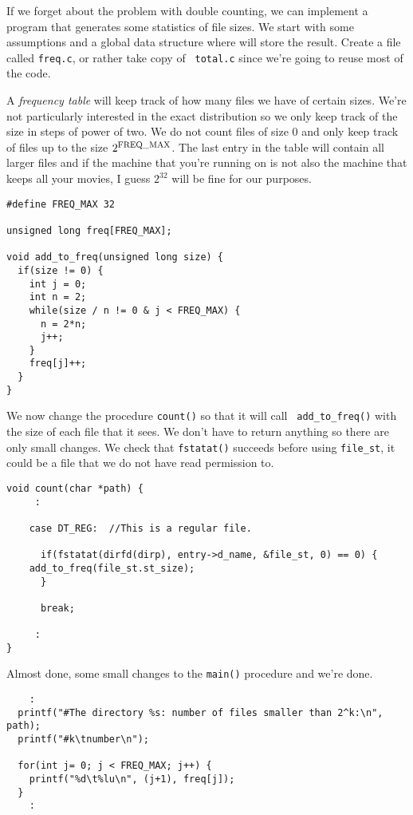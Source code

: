 \documentclass[a4paper,11pt]{article}
\begin{document}
If we forget about the problem with double counting, we can implement
a program that generates some statistics of file sizes. We start with
some assumptions and a global data structure where will store the
result. Create a file called {\tt freq.c}, or rather take copy of {\tt
  total.c} since we're going to reuse most of the code.

A {\em frequency table} will keep track of how many files we have of
certain sizes. We're not particularly interested in the exact
distribution so we only keep track of the size in steps of power of
two. We do not count files of size $0$ and only keep track of files up
to the size $2^{\rm FREQ\_MAX}$. The last entry in the table will contain
all larger files and if the machine that you're running on is not also
the machine that keeps all your movies, I guess $2^{32}$ will be fine
for our purposes.

\begin{lstlisting}
#define FREQ_MAX 32

unsigned long freq[FREQ_MAX];

void add_to_freq(unsigned long size) {
  if(size != 0) {
    int j = 0;
    int n = 2;
    while(size / n != 0 & j < FREQ_MAX) {
      n = 2*n;
      j++;
    }
    freq[j]++;
  }
}
\end{lstlisting}

We now change the procedure {\tt count()} so that it will call {\tt
  add\_to\_freq()} with the size of each file that it sees. We
don't have to return anything so there are only small changes. We
check that {\tt fstatat()} succeeds before using {\tt file\_st}, it
could be a file that we do not have read permission to. 

\begin{lstlisting}
void count(char *path) {
     :

    case DT_REG:  //This is a regular file.

      if(fstatat(dirfd(dirp), entry->d_name, &file_st, 0) == 0) {
	add_to_freq(file_st.st_size);
      }
      
      break;

     :
}  
\end{lstlisting}

Almost done, some small changes to the {\tt main()} procedure and
we're done.

\begin{lstlisting}
    :
  printf("#The directory %s: number of files smaller than 2^k:\n", path);
  printf("#k\tnumber\n");

  for(int j= 0; j < FREQ_MAX; j++) {
    printf("%d\t%lu\n", (j+1), freq[j]);
  }
    :
\end{lstlisting}
\end{document}
